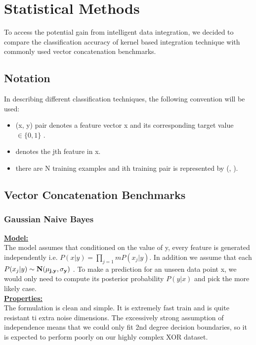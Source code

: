 \documentclass[8pts]{paper}
\begin{document}
\section{Statistical Methods}

To access the potential gain from intelligent data integration, we decided to compare the classification accuracy of kernel based integration technique with commonly used vector concatenation benchmarks. 

\subsection{Notation}
In describing different classification techniques, the following convention will be used:\\
\begin{itemize}
\setlength\itemsep{0em}
\item (x, y) pair denotes a feature vector x \mmin {} and its corresponding target value $\in \{0, 1\}$ .\\
\item {} denotes the jth feature in x.\\
\item there are N training examples and ith training pair is represented by (,  ).
\end{itemize}


\subsection{Vector Concatenation Benchmarks}

\subsubsection*{Gaussian Naive Bayes}
\underline{\textbf{Model:}}\\
The model assumes that conditioned on the value of y, every feature  is generated independently i.e. $P(x|y) = \prod_{j=1}{m} P(x_j|y)$. In addition we assume that each $P(x_j|y) \sim \bold{N(\mu_{j,y}, \sigma_y)}$ . To make a prediction for an unseen data point x, we would only need to compute  its posterior probability $P(y|x)$ and pick the more likely case.\\

\underline{\textbf{Properties:}}\\
The formulation is clean and simple. It is extremely fast train and is quite resistant ti extra noise dimensions. 
The excessively strong assumption of independence means that we could only fit 2nd degree decision boundaries, so it is expected to perform poorly on our highly complex XOR dataset.\\
\end{document}
